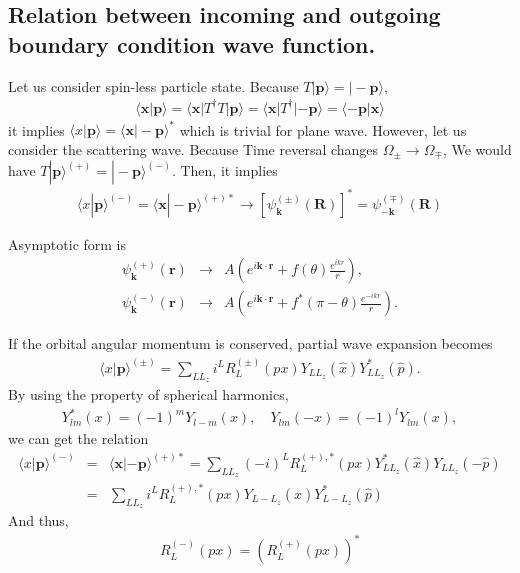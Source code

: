\documentclass[10pt]{book}
\def\bm{\boldsymbol}
\newcommand{\bea}{\begin{eqnarray}}
\newcommand{\eea}{\end{eqnarray}}
\newcommand{\no}{\nonumber \\}
\def\vp{{\bm p}}
\def\vk{{\bm k}}
\def\vx{{\bm x}}
\def\vr{{\bm r}}
\def\vR{{\bm R}}
\def\la{\langle}
\def\ra{\rangle}
\begin{document}
\subsection{Relation between incoming and outgoing boundary condition wave function.}
Let us consider spin-less particle state. Because $T|\vp\ra=|-\vp\ra$,
\bea 
\la \vx|\vp\ra =\la \vx|T^\dagger T|\vp\ra 
             =\la \vx|T^\dagger |-\vp\ra 
             =\la -\vp|\vx\ra  
\eea 
it implies $\la x|\vp\ra = \la \vx|-\vp\ra^*$ which is trivial for plane wave. 
However, let us consider the scattering wave. Because Time reversal changes 
$\Omega_{\pm}\to \Omega_{\mp}$,
We would have $T|\vp\ra^{(+)}=|-\vp\ra^{(-)}$. Then, it implies
\bea 
\la x|\vp\ra^{(-)} = \la \vx|-\vp\ra^{(+)*}\to \left[\psi_{\vk}^{(\pm)}(\vR)\right]^*=\psi_{-\vk}^{(\mp)}(\vR)
\eea 

Asymptotic form is 
\bea 
\psi_\vk^{(+)}(\vr) &\to& A\left(e^{i\vk\cdot\vr}+f(\theta)\frac{e^{ikr}}{r}\right), \no 
\psi_\vk^{(-)}(\vr) &\to& A\left(e^{i\vk\cdot\vr}+f^*(\pi-\theta)\frac{e^{-ikr}}{r}\right).
\eea 

If the orbital angular momentum is conserved, partial wave expansion becomes
\bea 
\la x|\vp\ra^{(\pm)}=\sum_{LL_z} i^L R_L^{(\pm)}(px) Y_{L L_z}(\hat{x})Y^*_{LL_z}(\hat{p}).
\eea 
By using the property of spherical harmonics,
\bea 
Y^*_{lm}(x)=(-1)^m Y_{l-m}(x),\quad Y_{lm}(-x)=(-1)^l Y_{lm}(x),
\eea 
we can get the relation 
\bea 
\la x|\vp\ra^{(-)} &=& \la \vx|-\vp\ra^{(+)*}=
  \sum_{LL_z} (-i)^L R_L^{(+),*}(px) Y^*_{L L_z}(\hat{x})Y_{LL_z}(-\hat{p})\no 
 &=&\sum_{LL_z} i^L R_L^{(+),*}(px) Y_{L -L_z}(\hat{x})Y^*_{L -L_z}(\hat{p}) 
\eea 
And thus, 
\bea 
R_{L}^{(-)}(px)=\left( R_{L}^{(+)}(px)\right)^*
\eea 
\end{document}
